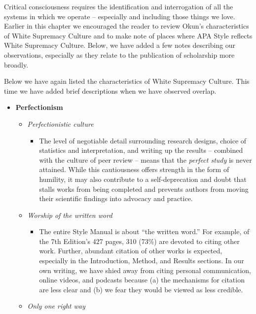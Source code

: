 \documentclass[
  11pt,
]{book}
\providecommand{\tightlist}{%
  \setlength{\itemsep}{0pt}\setlength{\parskip}{0pt}}
\begin{document}
Critical consciousness requires the identification and interrogation of all the systems in which we operate -- especially and including those things we love. Earlier in this chapter we encouraged the reader to review Okun's \citeyearpar{okun_white_2021} characteristics of White Supremacy Culture and to make note of places where APA Style reflects White Supremacy Culture. Below, we have added a few notes describing our observations, especially as they relate to the publication of scholarship more broadly.

Below we have again listed the characteristics of White Supremacy Culture. This time we have added brief descriptions when we have observed overlap.

\begin{itemize}
\tightlist
\item
  \textbf{Perfectionism}

  \begin{itemize}
  \tightlist
  \item
    \emph{Perfectionistic culture}

    \begin{itemize}
    \tightlist
    \item
      The level of negotiable detail surrounding research designs, choice of statistics and interpretation, and writing up the results -- combined with the culture of peer review -- means that the \emph{perfect study} is never attained. While this cautiousness offers strength in the form of humility, it may also contribute to a self-deprecation and doubt that stalls works from being completed and prevents authors from moving their scientific findings into advocacy and practice.
    \end{itemize}
  \item
    \emph{Worship of the written word}

    \begin{itemize}
    \tightlist
    \item
      The entire Style Manual is about ``the written word.'' For example, of the 7th Edition's 427 pages, 310 (73\%) are devoted to citing other work. Further, abundant citation of other works is expected, especially in the Introduction, Method, and Results sections. In our own writing, we have shied away from citing personal communication, online videos, and podcasts because (a) the mechanisms for citation are less clear and (b) we fear they would be viewed as less credible.
    \end{itemize}
  \item
    \emph{Only one right way}


\end{itemize}
\end{itemize}
\end{document}
